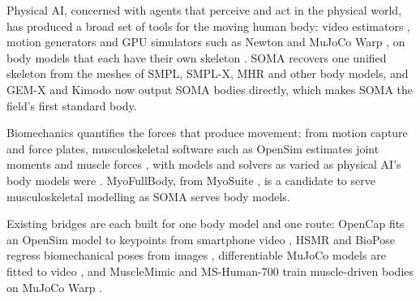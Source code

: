 \documentclass[11pt]{article}
\begin{document}
Physical AI, concerned with agents that perceive and act in the physical world, has produced a broad set of tools
for the moving human body: video estimators \cite{gemx,yang2026sam3dbody}, motion generators \cite{rempe2026kimodo}
and GPU simulators such as Newton and MuJoCo Warp \cite{newton,mujocowarp}, on body models that each have their own
skeleton \cite{loper2015smpl,ferguson2025mhr}. SOMA \cite{saito2026soma} recovers one unified skeleton from the meshes of SMPL, SMPL-X, MHR and other body models, and
GEM-X and Kimodo now output SOMA bodies directly, which makes SOMA the field's first standard body.

Biomechanics quantifies the forces that produce movement: from motion capture and force plates, musculoskeletal
software such as OpenSim \cite{delp2007opensim,seth2018opensim} estimates joint moments and muscle forces \cite{winter2009biomechanics}, with models and solvers as varied as physical
AI's body models were \cite{dembia2020moco,werling2023addbiomechanics}. MyoFullBody, from MyoSuite
\cite{caggiano2022myosuite}, is a candidate to serve musculoskeletal modelling as SOMA serves body models.

Existing bridges are each built for one body model and one route: OpenCap fits an OpenSim model to keypoints from
smartphone video \cite{uhlrich2023opencap,gilon2026monocular}, HSMR and BioPose regress biomechanical poses from
images \cite{xia2025hsmr,koleini2025biopose}, differentiable MuJoCo models are fitted to video
\cite{cotton2024differentiable}, and MuscleMimic and MS-Human-700 train muscle-driven bodies on MuJoCo Warp
\cite{li2026musclemimic,wei2026mshuman}.
\end{document}
